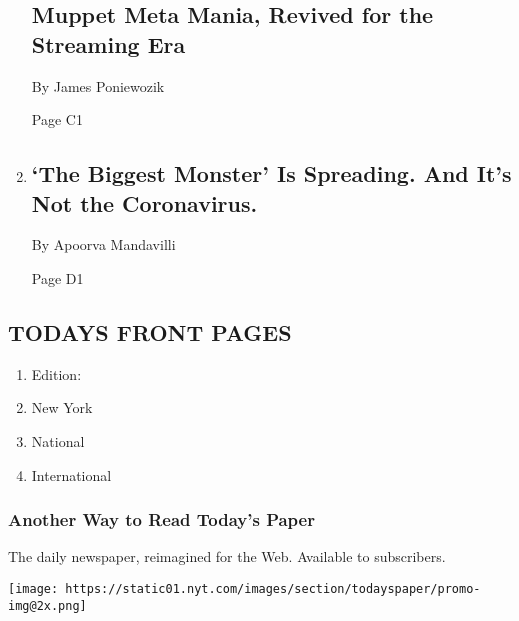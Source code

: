 \begin{enumerate}
  \hypertarget{muppet-meta-mania-revived-for-the-streaming-era}{%
  \subsection{Muppet Meta Mania, Revived for the Streaming
  Era}\label{muppet-meta-mania-revived-for-the-streaming-era}}

  By James Poniewozik

  Page C1
\item
  \href{/2020/08/03/health/coronavirus-tuberculosis-aids-malaria.html}{}

  \hypertarget{the-biggest-monster-is-spreading-and-its-not-the-coronavirus}{%
  \subsection{`The Biggest Monster' Is Spreading. And It's Not the
  Coronavirus.}\label{the-biggest-monster-is-spreading-and-its-not-the-coronavirus}}

  By Apoorva Mandavilli

  Page D1
\end{enumerate}

\hypertarget{todays-front-pages}{%
\subsection{TODAYS FRONT PAGES}\label{todays-front-pages}}

\begin{enumerate}
\def\labelenumi{\arabic{enumi}.}
\tightlist
\item
  Edition:
\item
  New York
\item
  National
\item
  International
\end{enumerate}

\href{http://app.nytimes.com/todayspaper}{}

\hypertarget{another-way-to-read-todays-paper}{%
\subsubsection{Another Way to Read Today's
Paper}\label{another-way-to-read-todays-paper}}

The daily newspaper, reimagined for the Web. Available to subscribers.

\texttt{[image: https://static01.nyt.com/images/section/todayspaper/promo-img@2x.png]}

